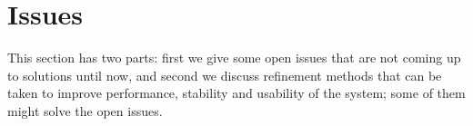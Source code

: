 \section{Issues}
\label{ch6}

This section has two parts: first we give some open issues that are not coming up to solutions until now, and second we discuss refinement methods that can be taken to improve performance, stability and usability of the system; some of them might solve the open issues.


